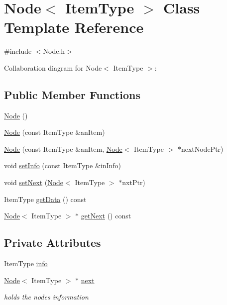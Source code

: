 \hypertarget{classNode}{}\section{Node$<$ Item\+Type $>$ Class Template Reference}
\label{classNode}


{\ttfamily \#include $<$Node.\+h$>$}



Collaboration diagram for Node$<$ Item\+Type $>$\+:
\subsection*{Public Member Functions}
\begin{DoxyCompactItemize}
\item 
\hyperlink{classNode_a627e94f4fba0e73c546e0fb2a7266f36}{Node} ()
\item 
\hyperlink{classNode_a0288598fcb0244739ce95099c26250ae}{Node} (const Item\+Type \&an\+Item)
\item 
\hyperlink{classNode_adf98d3f9b7227622cb5a0fdd7e8f0b18}{Node} (const Item\+Type \&an\+Item, \hyperlink{classNode}{Node}$<$ Item\+Type $>$ $\ast$next\+Node\+Ptr)
\item 
void \hyperlink{classNode_ab41c851a9c886a3a968ce194a6624745}{set\+Info} (const Item\+Type \&in\+Info)
\item 
void \hyperlink{classNode_a17b5e5de78a3d60db6893eb3309cfd4a}{set\+Next} (\hyperlink{classNode}{Node}$<$ Item\+Type $>$ $\ast$nxt\+Ptr)
\item 
Item\+Type \hyperlink{classNode_a5bd33b99616c5eb7d3e714461a954328}{get\+Data} () const 
\item 
\hyperlink{classNode}{Node}$<$ Item\+Type $>$ $\ast$ \hyperlink{classNode_a44fbda8e8d17a37e8203434c2909ea07}{get\+Next} () const 
\end{DoxyCompactItemize}
\subsection*{Private Attributes}
\begin{DoxyCompactItemize}
\item 
Item\+Type \hyperlink{classNode_a89a461ece718482bb741ff41b8b49e5d}{info}
\item 
\hyperlink{classNode}{Node}$<$ Item\+Type $>$ $\ast$ \hyperlink{classNode_ad11288556b42a32b4f46ed955b7c31fd}{next}
\begin{DoxyCompactList}\small\item\em holds the node\textquotesingle{}s information \end{DoxyCompactList}\end{DoxyCompactItemize}



